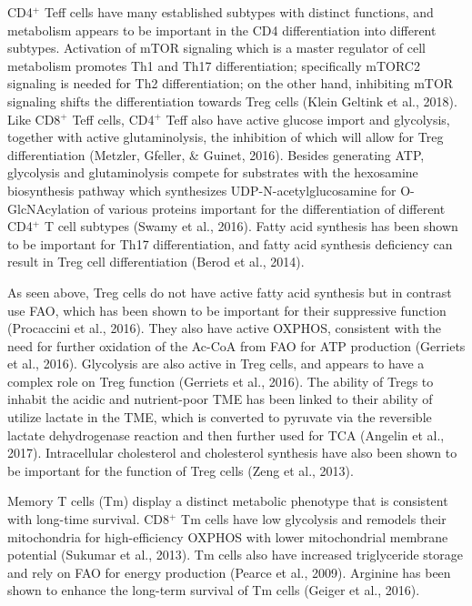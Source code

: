\documentclass[12pt,twoside,openany,\mydriver]{thesis}  %
\begin{document}
CD4\(^+\) Teff cells have many established subtypes with distinct functions, and metabolism appears to be important in the CD4 differentiation into different subtypes. Activation of mTOR signaling which is a master regulator of cell metabolism promotes Th1 and Th17 differentiation; specifically mTORC2 signaling is needed for Th2 differentiation; on the other hand, inhibiting mTOR signaling shifts the differentiation towards Treg cells (Klein Geltink et al., 2018). Like CD8\(^+\) Teff cells, CD4\(^+\) Teff also have active glucose import and glycolysis, together with active glutaminolysis, the inhibition of which will allow for Treg differentiation (Metzler, Gfeller, \& Guinet, 2016). Besides generating ATP, glycolysis and glutaminolysis compete for substrates with the hexosamine biosynthesis pathway which synthesizes UDP-N-acetylglucosamine for O-GlcNAcylation of various proteins important for the differentiation of different CD4\(^+\) T cell subtypes (Swamy et al., 2016). Fatty acid synthesis has been shown to be important for Th17 differentiation, and fatty acid synthesis deficiency can result in Treg cell differentiation (Berod et al., 2014).

As seen above, Treg cells do not have active fatty acid synthesis but in contrast use FAO, which has been shown to be important for their suppressive function (Procaccini et al., 2016). They also have active OXPHOS, consistent with the need for further oxidation of the Ac-CoA from FAO for ATP production (Gerriets et al., 2016). Glycolysis are also active in Treg cells, and appears to have a complex role on Treg function (Gerriets et al., 2016). The ability of Tregs to inhabit the acidic and nutrient-poor TME has been linked to their ability of utilize lactate in the TME, which is converted to pyruvate via the reversible lactate dehydrogenase reaction and then further used for TCA (Angelin et al., 2017). Intracellular cholesterol and cholesterol synthesis have also been shown to be important for the function of Treg cells (Zeng et al., 2013).

Memory T cells (Tm) display a distinct metabolic phenotype that is consistent with long-time survival. CD8\(^+\) Tm cells have low glycolysis and remodels their mitochondria for high-efficiency OXPHOS with lower mitochondrial membrane potential (Sukumar et al., 2013). Tm cells also have increased triglyceride storage and rely on FAO for energy production (Pearce et al., 2009). Arginine has been shown to enhance the long-term survival of Tm cells (Geiger et al., 2016).
\end{document}
